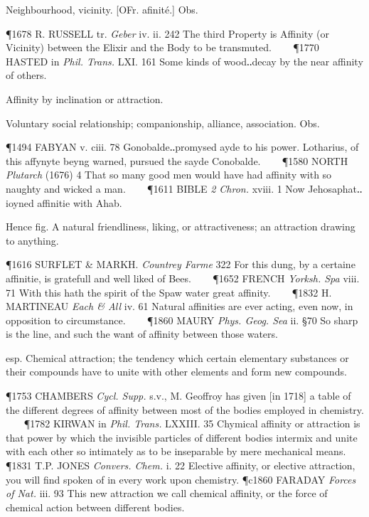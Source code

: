 \begin{description}[wide, labelwidth=!, labelindent=0pt]
\begin{myenumerate}
 Neighbourhood, vicinity. [OFr. afinité.] Obs. 

\P 1678 R. RUSSELL tr. \textit{Geber} iv. ii. 242 The third Property is Affinity (or Vicinity) between the Elixir and the Body to be transmuted.    
\P 1770 HASTED in \textit{Phil. Trans.} LXI. 161 Some kinds of wood‥decay by the near affinity of others.

 Affinity by inclination or attraction. 

 Voluntary social relationship; companionship, alliance, association. Obs. 

\P 1494 FABYAN v. ciii. 78 Gonobalde‥promysed ayde to his power. Lotharius, of this affynyte beyng warned, pursued the sayde Conobalde.    
\P 1580 NORTH \textit{Plutarch} (1676) 4 That so many good men would have had affinity with so naughty and wicked a man.    
\P 1611 BIBLE \textit{2 Chron.} xviii. 1 Now Jehosaphat‥ioyned affinitie with Ahab.

 Hence fig. A natural friendliness, liking, or attractiveness; an attraction drawing to anything. 

\P 1616 SURFLET \& MARKH. \textit{Countrey Farme} 322 For this dung, by a certaine affinitie, is gratefull and well liked of Bees.    
\P 1652 FRENCH \textit{Yorksh. Spa} viii. 71 With this hath the spirit of the Spaw water great affinity.    
\P 1832 H. MARTINEAU \textit{Each \& All} iv. 61 Natural affinities are ever acting, even now, in opposition to circumstance.    
\P 1860 MAURY \textit{Phys. Geog. Sea} ii. §70 So sharp is the line, and such the want of affinity between those waters.

 esp. Chemical attraction; the tendency which certain elementary substances or their compounds have to unite with other elements and form new compounds. 

\P 1753 CHAMBERS \textit{Cycl. Supp.} s.v., M. Geoffroy has given [in 1718] a table of the different degrees of affinity between most of the bodies employed in chemistry.    
\P 1782 KIRWAN in \textit{Phil. Trans.} LXXIII. 35 Chymical affinity or attraction is that power by which the invisible particles of different bodies intermix and unite with each other so intimately as to be inseparable by mere mechanical means.    
\P 1831 T.P. JONES \textit{Convers. Chem.} i. 22 Elective affinity, or elective attraction, you will find spoken of in every work upon chemistry.
\P c1860 FARADAY \textit{Forces of Nat.} iii. 93 This new attraction we call chemical affinity, or the force of chemical action between different bodies.


\end{myenumerate}
\end{description}
